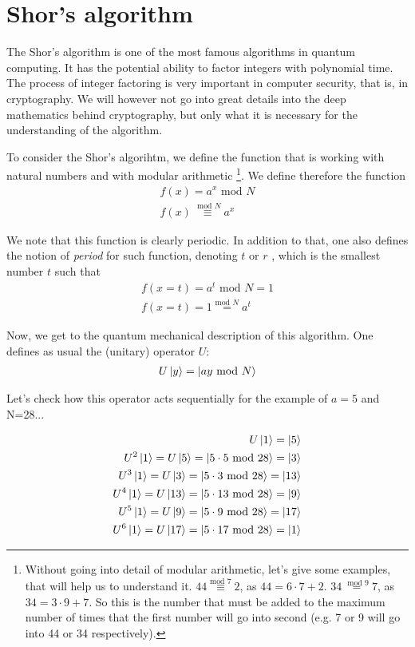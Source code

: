 \section{Shor's algorithm}
The Shor's algorithm is one of the most famous algorithms in quantum computing.
It has the potential ability to factor integers with polynomial time. The process of integer factoring 
is very important in computer security, that is, in cryptography. We will however not go into 
great details into the deep mathematics behind cryptography, but only what it is necessary for 
the understanding of the algorithm.

To consider the Shor's algorihtm, we define the function that is working with natural numbers
and with modular arithmetic \footnote{Without going into detail of modular arithmetic, let's give 
some examples, that will help us to understand it. $44 \stackrel{\text{mod }7}{\equiv} 2$, as $44=6\cdot7 + 2$. 
$34 \stackrel{\text{ mod }9} = 7$, as $34 = 3\cdot 9 + 7$. So this is the number that must be added to the maximum 
number of times that the first number will go into second (e.g. 7 or 9 will go into 44 or 34 respectively).}. 
We define therefore 
the function 
\begin{gather}
  f(x) = a^{x} \text{ mod } N \\
  f(x) \stackrel{\text{ mod } N}{\equiv} a^x
\end{gather}

We note that this function is clearly periodic. 
In addition to that, one also defines the notion of \textsl{period} for such function, denoting 
$t$ or $r$ \cite{noauthor_shors_nodate}, which is the smallest number $t$ such that 
\begin{gather}
  f(x=t) = a^t \text{ mod } N = 1 \\
  f(x=t) = 1 \stackrel{\text{mod } N} = a^t
\end{gather}


Now, we get to the quantum mechanical description of this algorithm. One defines as usual the (unitary) operator $U$:
\begin{gather}
  U\ket{y} = \ket{ay \text{ mod } N}
\end{gather}

Let's check how this operator acts sequentially for the example of $a=5$ and N=28...

\begin{equation}
\begin{split}
  U\ket{1}=\ket{5} \\
  U^2\ket{1} = U\ket{5} = \ket{5\cdot 5 \text{ mod } 28} = \ket{3} \\
  U^3\ket{1} = U\ket{3} = \ket{5\cdot 3 \text{ mod } 28} = \ket{13} \\
  U^4\ket{1} = U\ket{13} = \ket{5\cdot 13 \text{ mod } 28} = \ket{9} \\
  U^5\ket{1} = U\ket{9} = \ket{5\cdot 9 \text{ mod } 28} = \ket{17} \\
  U^6\ket{1} = U\ket{17} = \ket{5\cdot 17 \text{ mod } 28} = \ket{1} 
\end{split}
\end{equation}


